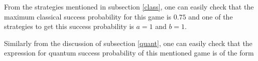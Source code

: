 \documentclass[]{svjour3}
\begin{document}



\begin{table}[htb]
	\begin{center}
		\setlength{\tabcolsep}{0.35em}
	\end{center}
\end{table}


From the strategies mentioned in subsection \ref{class}, one can easily check that the maximum classical success probability for this game is $0.75$ and one of the strategies to get this success probability is $a=1$ and $b=1$.

Similarly from the discussion of subsection \ref{quant}, one can easily check that the expression for quantum success probability of this mentioned game is of the form


\end{document}
